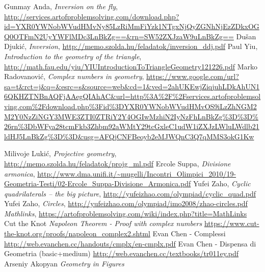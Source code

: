 \documentclass[a4paper,10pt]{article}
\begin{document}
 \begin{thebibliography}{9}
	\bibitem[1]{} Gunmay Anda, \emph{Inversion on the fly}, \url{http://services.artofproblemsolving.com/download.php?id=YXR0YWNobWVudHMvNy85LzRiMmFiYzk1NTgxNjQyZGNhNjEzZDkxOGQ0OTFmN2UyYWFlMDc3LnBkZg==&rn=SW52ZXJzaW9uLnBkZg==}
	\bibitem[2]{} Du\v{s}an Djuki\' c, \emph{Inversion}, \url{http://memo.szolda.hu/feladatok/inversion_ddj.pdf}
	\bibitem[3]{} Paul Yiu, \emph{Introduction to the geometry of the triangle}, \url{http://math.fau.edu/yiu/YIUIntroductionToTriangleGeometry121226.pdf}
	\bibitem[4]{} Marko Radovanovi\'c, \emph{Complex numbers in geometry}, 
	\url{https://www.google.com/url?sa=t&rct=j&q=&esrc=s&source=web&cd=1&ved=2ahUKEwjZiqjuhLDkAhUN16QKHZTNBnAQFjAAegQIAhAC&url=http\%3A\%2F\%2Fservices.artofproblemsolving.com\%2Fdownload.php\%3Fid\%3DYXR0YWNobWVudHMvOS9iLzZhNGM2M2Y0NzZiNGY3MWE3ZTI0ZTRiY2Y4OGIwMzhiN2IyNzFhLnBkZg\%3D\%3D\%26rn\%3DbWFya28tcmFkb3Zhbm92aWMtY29tcGxleC1udW1iZXJzLWluLWdlb21ldHJ5LnBkZg\%3D\%3D&usg=AFQjCNFBeoyb2eMJWQnC3Q7qMMS3okG1Kw}
	
	\bibitem[5]{} Milivoje Luki\'c, \emph{Projective geometry}, \url{http://memo.szolda.hu/feladatok/projg_ml.pdf}
	\bibitem[6]{} Ercole Suppa, \emph{Divisione armonica}, \url{http://www.dma.unifi.it/~mugelli/Incontri_Olimpici_2010/19-Geometria-Testi/02-Ercole_Suppa-Divisione_Armonica.pdf}
	\bibitem[7]{} Yufei Zaho, \emph{Cyclic quadrilaterals -- the big picture}, \url{http://yufeizhao.com/olympiad/cyclic_quad.pdf}
	\bibitem[8]{} Yufei Zaho, \emph{Circles}, \url{http://yufeizhao.com/olympiad/imo2008/zhao-circles.pdf}
	\bibitem[9]{} \emph{Mathlinks}, \url{https://artofproblemsolving.com/wiki/index.php?title=MathLinks}
	Cut the Knot \emph{Napoleon Theorem - Proof with complex numbers} \url{ https://www.cut-the-knot.org/proofs/napoleon_complex2.shtml}
	 Evan Chen - Complessi \url{http://web.evanchen.cc/handouts/cmplx/en-cmplx.pdf}
	 Evan Chen - Dispensa di Geometria (basic+medium) \url{http://web.evanchen.cc/textbooks/tr011ey.pdf}
	 Arseniy Akopyan \emph{Geometry in Figures}
\end{thebibliography}
 
 
\end{document}
